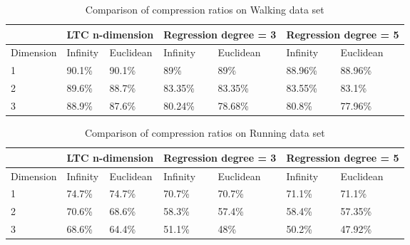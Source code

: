 \begin{table}
\begin{tabular}{|l|l|l|l|l|l|l|l|}
\hline
           & \multicolumn{2}{c|}{LTC n-dimension} & \multicolumn{2}{c|}{Regression degree = 3} & \multicolumn{3}{l|}{Regression degree = 5}\\ \hline
Dimension & Infinity   & Euclidean   & Infinity    & Euclidean     & Infinity      & \multicolumn{2}{l|}{Euclidean} \\ \hline
1          & 90.1\%     & 90.1\%      & 89\%        & 89\%          & 88.96\%       & \multicolumn{2}{l|}{88.96\%}   \\ \hline
2          & 89.6\%     & 88.7\%      & 83.35\%     & 83.35\%       & 83.55\%       & \multicolumn{2}{l|}{83.1\%}    \\ \hline
3          & 88.9\%     & 87.6\%      & 80.24\%     & 78.68\%       & 80.8\%        & \multicolumn{2}{l|}{77.96\%}   \\ \hline
\end{tabular}
\caption{Comparison of compression ratios on Walking data set}
\label{table:CR-compare-walking}
\end{table}


\begin{table}
\begin{tabular}{|l|l|l|l|l|l|l|l|}
\hline
           & \multicolumn{2}{c|}{LTC n-dimension} & \multicolumn{2}{c|}{Regression degree = 3} & \multicolumn{3}{l|}{Regression degree = 5}          \\ \hline
Dimension & Infinity   & Euclidean   & Infinity            & Euclidean           & Infinity& \multicolumn{2}{l|}{Euclidean} \\ \hline
1          & 74.7\%     & 74.7\%      & 70.7\%      & 70.7\%        & 71.1\%        & \multicolumn{2}{l|}{71.1\%}    \\ \hline
2          & 70.6\%     & 68.6\%      & 58.3\%      & 57.4\%        & 58.4\%        & \multicolumn{2}{l|}{57.35\%}   \\ \hline
3          & 68.6\%     & 64.4\%      & 51.1\%      & 48\%          & 50.2\%        & \multicolumn{2}{l|}{47.92\%}   \\ \hline
\end{tabular}
\caption{Comparison of compression ratios on Running data set}
\label{table:CR-compare-running}
\end{table}
